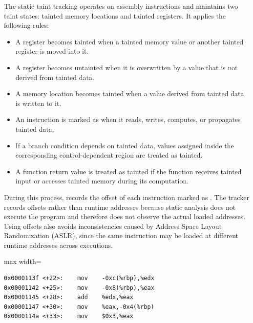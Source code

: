 The static taint tracking operates on assembly instructions and maintains two taint states: tainted memory locations and tainted registers. It applies the following rules:


\begin{itemize}[leftmargin=*]
    \setlength{\itemsep}{0pt}
    \setlength{\parskip}{0pt}

    \item A register becomes tainted when a tainted memory value or another tainted register is moved into it.

    \item A register becomes untainted when it is overwritten by a value that is not derived from tainted data.

    \item A memory location becomes tainted when a value derived from tainted data is written to it.

    \item An instruction is marked as \cryptobranch when it reads, writes, computes, or propagates tainted data.

    \item If a branch condition depends on tainted data, values assigned inside the corresponding control-dependent region are treated as tainted.

    \item A function return value is treated as tainted if the function receives tainted input or accesses tainted memory during its computation.
\end{itemize}

During this process, \greyboxfuzz records the offset of each instruction marked as \cryptobranch. The tracker records offsets rather than runtime addresses because static analysis does not execute the program and therefore does not observe the actual loaded addresses. Using offsets also avoids inconsistencies caused by Address Space Layout Randomization (ASLR), since the same instruction may be loaded at different runtime addresses across executions.



\begin{ZZlisting}[H]
\caption{Example of instruction-level taint propagation. If \texttt{-0xc(\%rbp)} is tainted, then \texttt{\%edx} becomes tainted and the addition at offset \texttt{0x00001145} is marked as \cryptobranch.}
\vspace*{12pt}
\centering
\begin{adjustbox}{max width=\textwidth}
\begin{CenteredBox}
\begin{minipage}{0.96\textwidth}
\begin{lstlisting}[style=asmstyle]
0x0000113f <+22>:    mov    -0xc(%rbp),%edx
0x00001142 <+25>:    mov    -0x8(%rbp),%eax
0x00001145 <+28>:    add    %edx,%eax
0x00001147 <+30>:    mov    %eax,-0x4(%rbp)
0x0000114a <+33>:    mov    $0x3,%eax
\end{lstlisting}
\end{minipage}
\end{CenteredBox}
\end{adjustbox}
\label{list:asm}
\end{ZZlisting}


